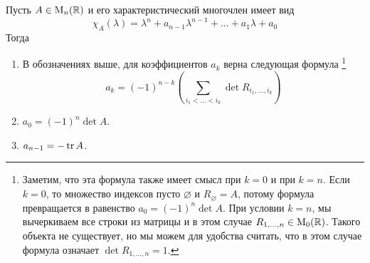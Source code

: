 \begin{claim}
Пусть $A\in\operatorname{M}_{n}(\mathbb R)$ и его характеристический многочлен имеет вид 
\[
\chi_A(\lambda) = \lambda^n + a_{n-1}\lambda^{n-1} + \ldots + a_1 \lambda + a_0
\]
Тогда
\begin{enumerate}
\item В обозначениях выше, для коэффициентов $a_k$ верна следующая формула%
\footnote{Заметим, что эта формула также имеет смысл при $k=0$ и при $k = n$.
Если $k = 0$, то множество индексов пусто $\varnothing$ и $R_\varnothing = A$, потому формула превращается в равенство $a_0 = (-1)^n\det A$.
При условии $ k = n$, мы вычеркиваем все строки из матрицы и в этом случае $R_{1,\ldots,n}\in\operatorname{M}_{0}(\mathbb R)$.
Такого объекта не существует, но мы можем для удобства считать, что в этом случае формула означает $\det R_{1,\ldots,n} = 1$.}
\[
a_{k} = (-1)^{n-k}\left(\sum_{i_1<\ldots<i_k}\det R_{i_1,\ldots,i_k}\right)
\]

\item $a_0 = (-1)^n\det A$.

\item $a_{n-1} =  - \operatorname{tr} A$.
\end{enumerate}
\end{claim}
